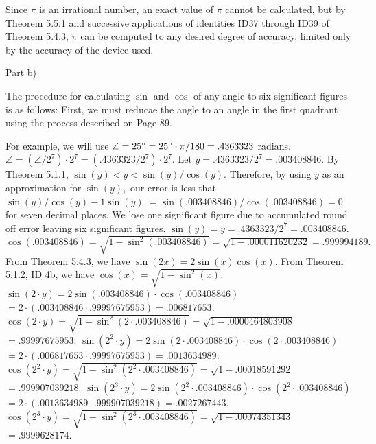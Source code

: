 
Since $\pi$ is an irrational number, an exact value of $\pi$ cannot be calculated, but by Theorem 5.5.1 and successive applications of identities ID37 through ID39 of Theorem 5.4.3, $\pi$ can be computed to any desired degree of accuracy, limited only by the accuracy of the device used.\nl

Part b)\nl

The procedure for calculating $\sin$ and $\cos$ of any angle to six significant figures is as follows:  First, we must reducae the angle to an angle in the first quadrant using the process described on Page 89.\nl

For example, we will use $\angle = 25^{\circ} = 25^{\circ}\cdot\pi/180 = .4363323$ radians.\nl
$\angle = (\angle/2^{7})\cdot2^{7} = (.4363323/2^{7})\cdot2^{7}.$  Let $y = .4363323/2^{7} = .003408846.$\nl
By Theorem 5.1.1, $\sin(y) < y < \sin(y)/\cos(y).$   Therefore, by using $y$ as an approximation for $\sin(y),$ our error is less that $\sin(y)/\cos(y) - 1\sin(y)$ $ = \sin(.003408846)/\cos(.003408846) = 0$ for seven decimal places.  We lose one significant figure due to accumulated round off error leaving six significant figures.\nl
$\sin(y) = y = .4363323/2^{7} = .003408846.$\nl
$\cos(.003408846) = \sqrt{1 - \sin^{2}(.003408846)} =  \sqrt{1 - .000011620232} = .999994189.$\nl
From Theorem 5.4.3, we have $\sin(2x) = 2\sin(x)\cos(x).$\nl
From Theorem 5.1.2, ID 4b, we have $\cos(x) = \sqrt{1 - \sin^{2}(x)}.$\nl
$\sin(2\cdot y) = 2\sin(.003408846)\cdot\cos(.003408846)$\nl
\indent $= 2\cdot(.003408846\cdot.99997675953) = .006817653.$\nl
$\cos(2\cdot y) = \sqrt{1 - \sin^{2}(2\cdot.003408846)} = \sqrt{1 - .0000464803908}$\nl
$ = .99997675953.$\nl
$\sin(2^{2}\cdot y) = 2\sin(2\cdot.003408846)\cdot\cos(2\cdot.003408846)$\nl
$ = 2\cdot(.006817653\cdot.99997675953) = .0013634989.$\nl
$\cos(2^{2}\cdot y) = \sqrt{1 - \sin^{2}(2^{2}\cdot.003408846)} = \sqrt{1 - .00018591292}$\nl
$ = .999907039218.$\nl
$\sin(2^{3}\cdot y) = 2\sin(2^{2}\cdot.003408846)\cdot\cos(2^{2}\cdot.003408846)$\nl
$ = 2\cdot(.0013634989\cdot.999907039218) = .0027267443.$\nl
$\cos(2^{3}\cdot y) = \sqrt{1 - \sin^{2}(2^{3}\cdot.003408846)} = \sqrt{1 - .00074351343}$\nl
$ = .9999628174.$\nl
